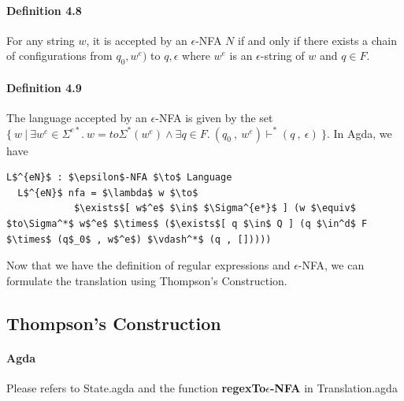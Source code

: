 \documentclass[twoside,openright,final]{bhamthesis}
\begin{document}
\paragraph{Definition 4.8} For any string \(w\), it is accepted by an \(\epsilon\)-NFA \(N\)
if and only if there exists a chain of configurations from \(q_0 ,
w^e)\) to \(q , \epsilon\) where \(w^e\) is an \(\epsilon\)-string of \(w\) and \(q \in
F\). 

\paragraph{Definition 4.9} The language accepted by an
\(\epsilon\)-NFA is given by the set \(\{\ w\ |\ \exists w^e\in
\Sigma^{e*}.\ w = to\Sigma^*(w^e) \wedge \exists q\in F.\ (q_0\ ,\
w^e) \vdash^* (q\ ,\ \epsilon)\ \}\). In Agda, we have
\begin{lstlisting}[mathescape=true,aboveskip=0pt]
  L$^{eN}$ : $\epsilon$-NFA $\to$ Language
  L$^{eN}$ nfa = $\lambda$ w $\to$ 
            $\exists$[ w$^e$ $\in$ $\Sigma^{e*}$ ] (w $\equiv$ $to\Sigma^*$ w$^e$ $\times$ ($\exists$[ q $\in$ Q ] (q $\in^d$ F $\times$ (q$_0$ , w$^e$) $\vdash^*$ (q , []))))
\end{lstlisting} 
\vspace{1pc}
\par Now that we have the definition of regular expressions and
\(\epsilon\)-NFA, we can formulate the translation using Thompson's Construction.

\subsection{Thompson's Construction}
\paragraph{Agda} Please refers to State.agda and the function
\textbf{regexTo\(\epsilon\)-NFA} in Translation.agda
\end{document}

